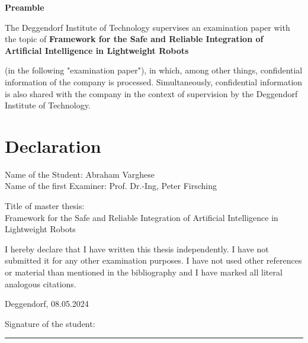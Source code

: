 \documentclass[12pt]{report}
\begin{document}
\vspace{1.5 cm}
         
\raggedright
\textbf{Preamble}

\vspace{0.5 cm}
         
The Deggendorf Institute of Technology supervises an examination paper with the topic of \textbf{Framework for the Safe and Reliable Integration of Artificial Intelligence in Lightweight Robots}

\vspace{0.5cm}
         
\mbox{}

\vspace{0.5cm}
\begin{center}
    (in the following "examination paper"), in which, among other things, confidential 
    information of the company is processed. Simultaneously, confidential information 
    is also shared with the company in the context of supervision by the Deggendorf Institute of Technology.
\end{center}

\newpage
\raggedright
\section*{Declaration}

\noindent
Name of the Student: Abraham Varghese\\
Name of the first Examiner: Prof. Dr.-Ing, Peter Firsching\\

\vspace{1 cm}

Title of master thesis:\\
Framework for the Safe and Reliable Integration of Artificial Intelligence in Lightweight Robots

\vspace{1.5 cm}

I hereby declare that I have written this thesis independently. I have not submitted it for any other examination purposes. I have not used other references or material than mentioned in the bibliography and I have marked all literal analogous citations.

\vspace{1.5 cm}
\raggedright
Deggendorf, 08.05.2024

\hspace{4 cm}
Signature of the student: \rule{6cm}{0.5pt} %
\end{document}
